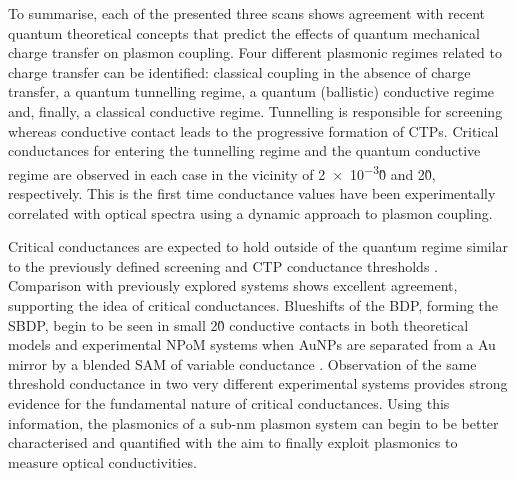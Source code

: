 \documentclass[a4paper, 11pt]{article}
\begin{document}
To summarise, each of the presented three scans shows agreement with recent quantum theoretical concepts that predict the effects of quantum mechanical charge transfer on plasmon coupling. Four different plasmonic regimes related to charge transfer can be identified: classical coupling in the absence of charge transfer, a quantum tunnelling regime, a quantum (ballistic) conductive regime and, finally, a classical conductive regime. Tunnelling is responsible for screening whereas conductive contact leads to the progressive formation of CTPs. Critical conductances for entering the tunnelling regime and the quantum conductive regime are observed in each case in the vicinity of \num{2e-3}\G0 and 2\G0, respectively. This is the first time conductance values have been experimentally correlated with optical spectra using a dynamic approach to plasmon coupling.

Critical conductances are expected to hold outside of the quantum regime similar to the previously defined screening and CTP conductance thresholds \cite{perez2010, perez2011}. Comparison with previously explored systems shows excellent agreement, supporting the idea of critical conductances. Blueshifts of the BDP, forming the SBDP, begin to be seen in small 2\G0 conductive contacts in both theoretical models \cite{perez2010, perez2011} and experimental NPoM systems when AuNPs are separated from a Au mirror by a blended SAM of variable conductance \cite{benz2014}. Observation of the same threshold conductance in two very different experimental systems provides strong evidence for the fundamental nature of critical conductances.
Using this information, the plasmonics of a sub-nm plasmon system can begin to be better characterised and quantified with the aim to finally exploit plasmonics to measure optical conductivities.
\end{document}
